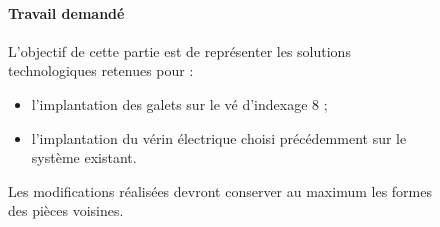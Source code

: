 \begin{figure}[ht!]
\begin{minipage}{0.55\linewidth}
\paragraph{Travail demandé} L’objectif de cette partie est de représenter les solutions technologiques retenues pour :
\begin{itemize}
 \item l’implantation des galets sur le vé d’indexage 8 ;
 \item l’implantation du vérin électrique choisi précédemment sur le système existant.
\end{itemize}

Les modifications réalisées devront conserver au maximum les formes des pièces voisines.


\end{minipage}
\end{figure}
